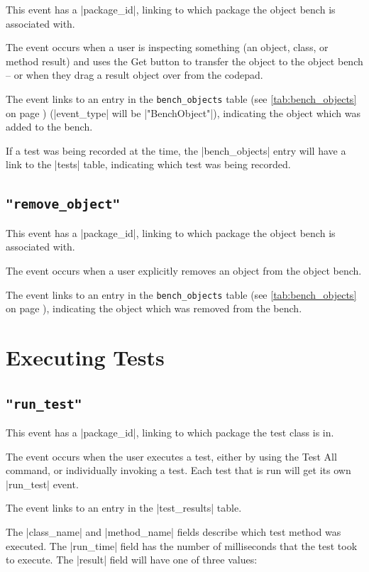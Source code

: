 \documentclass{report}
\newcommand{\myref}[1]{\autoref{#1} on page \pageref*{#1}}
\newcommand{\tabref}[1]{\lstinline|#1| table (see \myref{tab:#1})}
\begin{document}
This event has a |package_id|, linking to which package the object
bench is associated with.

The event occurs when a user is inspecting something (an object,
class, or method result) and uses the Get button to transfer the
object to the object bench -- or when they drag a result object over
from the codepad.
  
The event links to an entry in the \tabref{bench_objects} (|event_type| will
be |"BenchObject"|), indicating
the object which was added to the bench.

If a test was being recorded at the time, the |bench_objects| entry
will have a link to the |tests| table, indicating which test was being recorded.

\subsection{\lstinline!"remove_object"!}

This event has a |package_id|, linking to which package the object
bench is associated with.

The event occurs when a user explicitly removes an object from the object bench.
  
The event links to an entry in the \tabref{bench_objects}, indicating
the object which was removed from the bench.

\section{Executing Tests}

\subsection{\lstinline!"run_test"!}

This event has a |package_id|, linking to which package the test class
is in.

The event occurs when the user executes a test, either by using the
Test All command, or individually invoking a test.  Each test that is
run will get its own |run_test| event.

The event links to an entry in the |test_results| table.


The |class_name| and |method_name| fields describe which test method was
executed.  The |run_time| field has the number of milliseconds that the test
took to execute.  The |result| field will have one of three values:
\end{document}
